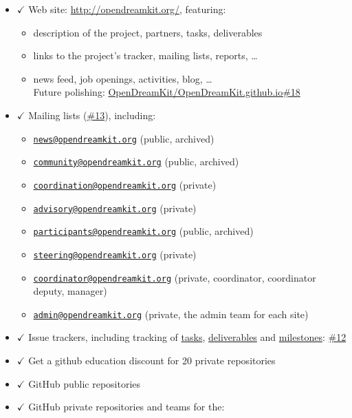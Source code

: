 \begin{itemize}
\tightlist
\item
  \(\checkmark\) Web site: \url{http://opendreamkit.org/}, featuring:

  \begin{itemize}
  \tightlist
  \item
    description of the project, partners, tasks, deliverables
  \item
    links to the project's tracker, mailing lists, reports, \ldots{}
  \item
    news feed, job openings, activities, blog, \ldots{}\\
    Future polishing:
    \href{https://github.com/OpenDreamKit/OpenDreamKit.github.io/issues/18}{OpenDreamKit/OpenDreamKit.github.io\#18}
  \end{itemize}
\item
  \(\checkmark\) Mailing lists
  (\href{https://github.com/OpenDreamKit/OpenDreamKit/issues/13}{\#13}),
  including:

  \begin{itemize}
  \tightlist
  \item
    \href{mailto:news@opendreamkit.org}{\nolinkurl{news@opendreamkit.org}}
    (public, archived)
  \item
    \href{mailto:community@opendreamkit.org}{\nolinkurl{community@opendreamkit.org}}
    (public, archived)
  \item
    \href{mailto:coordination@opendreamkit.org}{\nolinkurl{coordination@opendreamkit.org}}
    (private)
  \item
    \href{mailto:advisory@opendreamkit.org}{\nolinkurl{advisory@opendreamkit.org}}
    (private)
  \item
    \href{mailto:participants@opendreamkit.org}{\nolinkurl{participants@opendreamkit.org}}
    (public, archived)
  \item
    \href{mailto:steering@opendreamkit.org}{\nolinkurl{steering@opendreamkit.org}}
    (private)
  \item
    \href{mailto:coordinator@opendreamkit.org}{\nolinkurl{coordinator@opendreamkit.org}}
    (private, coordinator, coordinator deputy, manager)
  \item
    \href{mailto:admin@opendreamkit.org}{\nolinkurl{admin@opendreamkit.org}}
    (private, the admin team for each site)
  \end{itemize}
\item
  \(\checkmark\) Issue trackers, including tracking of
  \href{https://github.com/OpenDreamKit/OpenDreamKit/labels/task}{tasks},
  \href{https://github.com/OpenDreamKit/OpenDreamKit/labels/deliverable}{deliverables}
  and
  \href{https://github.com/OpenDreamKit/OpenDreamKit/milestones}{milestones}:
  \href{https://github.com/OpenDreamKit/OpenDreamKit/issues/12}{\#12}
\item
  \(\checkmark\) Get a github education discount for 20 private
  repositories
\item
  \(\checkmark\) GitHub public repositories
\item
  \(\checkmark\) GitHub private repositories and teams for the:


\end{itemize}
